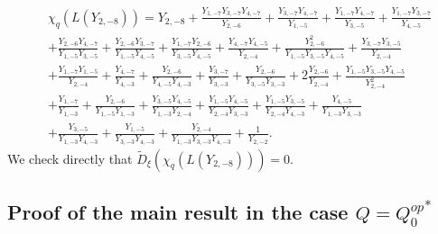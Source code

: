 \documentclass[12pt]{amsart}
\theoremstyle{plain}
\theoremstyle{definition}
\numberwithin{equation}{section}
\newcommand{\td}{{\widetilde{D}}}
\begin{document}
\begin{align*}
& \chi_q(L(Y_{2,-8})) = Y_{2,-8} + \frac{Y_{1,-7} Y_{3,-7} Y_{4,-7}}{Y_{2,-6}}
+ \frac{Y_{3,-7} Y_{4,-7}}{Y_{1,-5}}
+ \frac{Y_{1,-7} Y_{4,-7}}{Y_{3,-5}}
+ \frac{Y_{1,-7} Y_{3,-7}}{Y_{4,-5}} \\
& + \frac{Y_{2,-6} Y_{4,-7}}{Y_{1,-5} Y_{3,-5}}
 + \frac{Y_{2,-6} Y_{3,-7}}{Y_{1,-5} Y_{4,-5}}
+ \frac{Y_{1,-7} Y_{2,-6}}{Y_{3,-5} Y_{4,-5}} + \frac{Y_{4,-7} Y_{4,-5}}{Y_{2,-4}}
+ \frac{Y_{2,-6}^2}{Y_{1,-5} Y_{3,-5} Y_{4,-5}} + \frac{Y_{3,-7} Y_{3,-5}}{Y_{2,-4}}
\\
& + \frac{Y_{1,-7} Y_{1,-5}}{Y_{2,-4}}+ \frac{Y_{4,-7}}{Y_{4,-3}}
+ \frac{Y_{2,-6}}{Y_{4,-5} Y_{4,-3}}
+ \frac{Y_{3,-7}}{Y_{3,-3}}
+ \frac{Y_{2,-6}}{Y_{3,-5} Y_{3,-3}} + 2 \frac{Y_{2,-6}}{Y_{2,-4}}
+ \frac{Y_{1,-5} Y_{3,-5} Y_{4,-5}}{Y_{2,-4}^2}
\\
& + \frac{Y_{1,-7}}{Y_{1,-3}}
+ \frac{Y_{2,-6}}{Y_{1,-5} Y_{1,-3}} + \frac{Y_{3,-5} Y_{4,-5}}{Y_{1,-3} Y_{2,-4}}
+ \frac{Y_{1,-5} Y_{4,-5}}{Y_{2,-4} Y_{3,-3}}
+ \frac{Y_{1,-5} Y_{3,-5}}{Y_{2,-4} Y_{4,-3}} + \frac{Y_{4,-5}}{Y_{1,-3} Y_{3,-3}}
\\
& + \frac{Y_{3,-5}}{Y_{1,-3} Y_{4,-3}}
+ \frac{Y_{1,-5}}{Y_{3,-3} Y_{4,-3}} + \frac{Y_{2,-4}}{Y_{1,-3} Y_{3,-3} Y_{4,-3}}
+ \frac{1}{Y_{2,-2}}.
\end{align*}
We check directly that $\td_{\xi}(\chi_q(L(Y_{2,-8})))=0$. 


\subsection{Proof of the main result in the case \texorpdfstring{$Q = {Q_0^{op}}^{*}$}{Q = (Q0op)*}}
\end{document}
